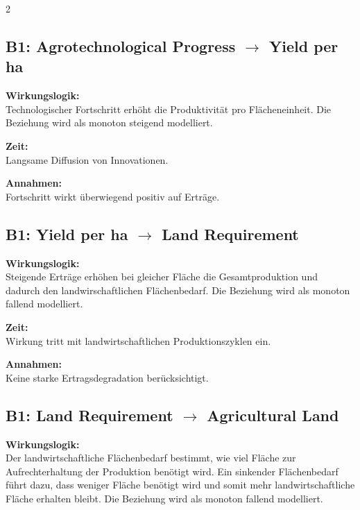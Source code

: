 \documentclass[10pt, a4paper]{article}
\begin{document}
\begin{multicols}{2}
\begin{minipage}{\linewidth}
\subsection*{B1: Agrotechnological Progress $\rightarrow$ Yield per ha}

\textbf{Wirkungslogik:}\\
Technologischer Fortschritt erhöht die Produktivität pro Flächeneinheit.
Die Beziehung wird als monoton steigend modelliert.

\textbf{Zeit:}\\
Langsame Diffusion von Innovationen.

\textbf{Annahmen:}\\
Fortschritt wirkt überwiegend positiv auf Erträge.
\end{minipage}\vspace{1em}

\begin{minipage}{\linewidth}
\subsection*{B1: Yield per ha $\rightarrow$ Land Requirement}

\textbf{Wirkungslogik:}\\
Steigende Erträge erhöhen bei gleicher Fläche die Gesamtproduktion und dadurch den landwirschaftlichen Flächenbedarf.
Die Beziehung wird als monoton fallend modelliert.

\textbf{Zeit:}\\
Wirkung tritt mit landwirtschaftlichen Produktionszyklen ein.

\textbf{Annahmen:}\\
Keine starke Ertragsdegradation berücksichtigt.
\end{minipage}\vspace{1em}

\begin{minipage}{\linewidth}
\subsection*{B1: Land Requirement $\rightarrow$ Agricultural Land}

\textbf{Wirkungslogik:}\\
Der landwirtschaftliche Flächenbedarf bestimmt, wie viel Fläche zur Aufrechterhaltung der Produktion benötigt wird.
Ein sinkender Flächenbedarf führt dazu, dass weniger Fläche benötigt wird und somit mehr landwirtschaftliche Fläche erhalten bleibt.
Die Beziehung wird als monoton fallend modelliert.


\end{minipage}
\end{multicols}
\end{document}
